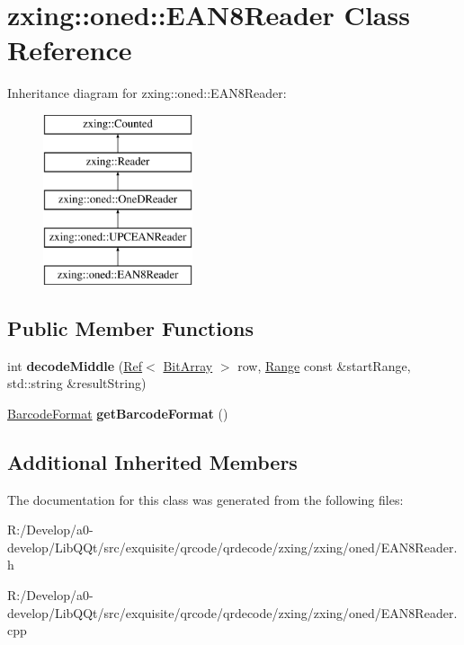 \hypertarget{classzxing_1_1oned_1_1_e_a_n8_reader}{}\section{zxing\+:\+:oned\+:\+:E\+A\+N8\+Reader Class Reference}
\label{classzxing_1_1oned_1_1_e_a_n8_reader}
Inheritance diagram for zxing\+:\+:oned\+:\+:E\+A\+N8\+Reader\+:\begin{figure}[H]
\begin{center}
\leavevmode
\includegraphics[height=5.000000cm]{classzxing_1_1oned_1_1_e_a_n8_reader}
\end{center}
\end{figure}
\subsection*{Public Member Functions}
\begin{DoxyCompactItemize}
\item 
\mbox{\label{classzxing_1_1oned_1_1_e_a_n8_reader_afc815c17313bd4c2302ba8a57230c217}} 
int {\bfseries decode\+Middle} (\mbox{\hyperlink{classzxing_1_1_ref}{Ref}}$<$ \mbox{\hyperlink{classzxing_1_1_bit_array}{Bit\+Array}} $>$ row, \mbox{\hyperlink{structzxing_1_1oned_1_1_one_d_reader_1_1_range}{Range}} const \&start\+Range, std\+::string \&result\+String)
\item 
\mbox{\label{classzxing_1_1oned_1_1_e_a_n8_reader_a8c39438d317815f2ca5c43e1d8c7c171}} 
\mbox{\hyperlink{classzxing_1_1_barcode_format}{Barcode\+Format}} {\bfseries get\+Barcode\+Format} ()
\end{DoxyCompactItemize}
\subsection*{Additional Inherited Members}


The documentation for this class was generated from the following files\+:\begin{DoxyCompactItemize}
\item 
R\+:/\+Develop/a0-\/develop/\+Lib\+Q\+Qt/src/exquisite/qrcode/qrdecode/zxing/zxing/oned/E\+A\+N8\+Reader.\+h\item 
R\+:/\+Develop/a0-\/develop/\+Lib\+Q\+Qt/src/exquisite/qrcode/qrdecode/zxing/zxing/oned/E\+A\+N8\+Reader.\+cpp\end{DoxyCompactItemize}
